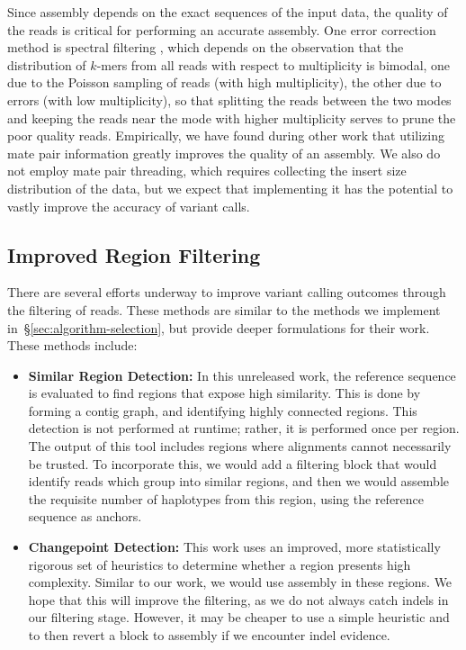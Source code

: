 \documentclass{acm_proc_article-sp}
\begin{document}
Since assembly depends on the exact sequences of the input data, the quality of
the reads is critical for performing an accurate assembly.
One error correction method is spectral filtering \cite{pevzner01}, which depends
on the observation that the distribution of $k$-mers from all reads with respect to
multiplicity is bimodal, one due to the Poisson sampling of reads (with high
multiplicity), the other due to errors (with low multiplicity), so that splitting
the reads between the two modes and keeping the reads near the mode with higher
multiplicity serves to prune the poor quality reads.
Empirically, we have found during other work that utilizing mate pair
information greatly improves the quality of an assembly. %
We also do not employ mate pair threading, which requires collecting the
insert size distribution of the data, but we expect that implementing it has
the potential to vastly improve the accuracy of variant calls.

\subsection{Improved Region Filtering}
\label{sec:improved-filtering}

There are several efforts underway to improve variant calling outcomes through the filtering of reads. These methods are similar
to the methods we implement in~\S\ref{sec:algorithm-selection}, but provide deeper formulations for their work. These
methods include:

\begin{itemize}
\item \textbf{Similar Region Detection:} In this unreleased work, the reference sequence is evaluated to find regions that expose
high similarity. This is done by forming a contig graph, and identifying highly connected regions. This detection is not performed
at runtime; rather, it is performed once per region. The output of this tool includes regions where alignments cannot necessarily
be trusted. To incorporate this, we would add a filtering block that would identify reads which group into similar regions, and then
we would assemble the requisite number of haplotypes from this region, using the reference sequence as anchors.
\item \textbf{Changepoint Detection:} This work uses an improved, more statistically rigorous set of heuristics to determine whether
a region presents high complexity. Similar to our work, we would use assembly in these regions. We hope that this will improve
the filtering, as we do not always catch indels in our filtering stage. However, it may be cheaper to use a simple heuristic and to
then revert a block to assembly if we encounter indel evidence.
\end{itemize}
\end{document}
